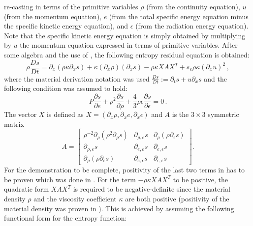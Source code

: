 \documentclass[review]{elsarticle}
\begin{document}
re-casting   in terms of the primitive variables $\rho$ (from  the continuity equation), $u$  (from  the momentum equation),
$e$ (from the total specific energy equation minus the specific kinetic energy equation), and $\epsilon$ (from the radiation energy equation). Note that 
the specific kinetic energy equation is simply obtained by multiplying by $u$ the momentum equation expressed in terms of primitive variables. After some algebra and the use of , the following entropy residual equation is obtained:
%
\begin{equation} \label{eq:app_entr_eq_non_equil}
\rho \frac{Ds}{Dt} = \partial_x \left( \rho \kappa \partial_x s \right) + \kappa \left(\partial_x \rho\right) \left( \partial_x s\right) - \rho \kappa X A X^T  + s_e \rho \kappa (\partial_x u)^2 \, ,
\end{equation} 
% 
where the material derivation notation was used $\frac{Ds}{Dt} := \partial_t s + u \partial_x s$ and the following condition was assumed to hold:
%
\begin{equation} \label{eq:visc_reg_assumptions}
P \frac{\partial s}{\partial e} + \rho^2 \frac{\partial s}{\partial \rho} + \frac{4}{3} \rho \epsilon \frac{\partial s}{\partial \epsilon} = 0 \,. 
\end{equation}
%
The vector $X$ is defined as $X=\left( \partial_x \rho, \partial_x e, \partial_x \epsilon \right)$ and $A$ is the $3 \times 3$ symmetric matrix
%
 \begin{equation}
 A = 
 \left[
 \begin{array}{ccc}
\rho^{-2}\partial_{\rho} \left( \rho^2 \partial_{\rho} s \right) & \partial_{\rho,e} s & \partial_{\rho} \left( \rho \partial_{\epsilon} s \right) \\
 \partial_{\rho,e} s & \partial_{e,e} s & \partial_{e,\epsilon} s \\
 \partial_{\rho} \left( \rho \partial_{\epsilon} s \right) & \partial_{e,\epsilon} s & \partial_{\epsilon,\epsilon} s
 \end{array}
 \right] .
 \end{equation}
 For the demonstration to be complete, positivity of the last two terms in  has to be proven which was done in \cite{our_jcp_radhy_paper}. For the term $- \rho \kappa X A X^T$ to be positive, the quadratic form $ X A X^T$ is required to be negative-definite since the material density $\rho$ and the viscosity coefficient $\kappa$ are both positive (positivity of the material density was proven in \cite{jlg}). This is achieved by assuming the following functional form for the entropy function:
\end{document}
